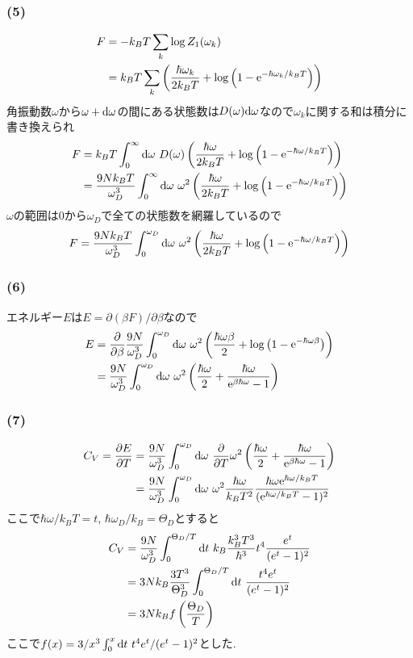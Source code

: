 \subsubsection*{(5)}
\begin{align}
  F&=-k_BT\sum_k\log Z_1(\omega_k)\nonumber\\
  &=k_BT\sum_k\left(\frac{\hbar\omega_k}{2k_BT}+\log\left(1-{\rm e}^{-\hbar\omega_k/k_BT}\right)\right)
\end{align}
角振動数$\omega$から$\omega+{\rm d}\omega$の間にある状態数は$D(\omega){\rm d}\omega$なので$\omega_k$に関する和は積分に書き換えられ
\begin{align}
  F&=k_BT\int_0^\infty{\rm d}\omega\ D(\omega)\left(\frac{\hbar\omega}{2k_BT}+\log\left(1-{\rm e}^{-\hbar\omega/k_BT}\right)\right)\nonumber\\
  &=\frac{9Nk_BT}{\omega_D^3}\int_0^\infty{\rm d}\omega\ \omega^2\left(\frac{\hbar\omega}{2k_BT}+\log\left(1-{\rm e}^{-\hbar\omega/k_BT}\right)\right)
\end{align}
$\omega$の範囲は$0$から$\omega_D$で全ての状態数を網羅しているので
\begin{align}
  F=\frac{9Nk_BT}{\omega_D^3}\int_0^{\omega_D}{\rm d}\omega\ \omega^2\left(\frac{\hbar\omega}{2k_BT}+\log\left(1-{\rm e}^{-\hbar\omega/k_BT}\right)\right)
\end{align}
\subsubsection*{(6)}
エネルギー$E$は$E=\partial(\beta F)/\partial\beta$なので
\begin{align}
  E&=\frac{\partial}{\partial\beta}\frac{9N}{\omega_D^3}\int_0^{\omega_D}{\rm d}\omega\ \omega^2\left(\frac{\hbar\omega\beta}{2}+\log\left(1-{\rm e}^{-\hbar\omega\beta}\right)\right)\nonumber\\
  &=\frac{9N}{\omega_D^3}\int_0^{\omega_D}{\rm d}\omega\ \omega^2\left(\frac{\hbar\omega}{2}+\frac{\hbar\omega}{{\rm e}^{\beta\hbar\omega}-1}\right)
\end{align}
\subsubsection*{(7)}
\begin{align}
  C_V=\frac{\partial E}{\partial T}&=\frac{9N}{\omega_D^3}\int_0^{\omega_D}{\rm d}\omega\ \frac{\partial}{\partial T}\omega^2\left(\frac{\hbar\omega}{2}+\frac{\hbar\omega}{{\rm e}^{\beta\hbar\omega}-1}\right)\nonumber\\
  &=\frac{9N}{\omega_D^3}\int_0^{\omega_D}{\rm d}\omega\ \omega^2\frac{\hbar\omega}{k_BT^2}\frac{\hbar\omega{\rm e}^{\hbar\omega/k_BT}}{({\rm e}^{\hbar\omega/k_BT}-1)^2}
\end{align}
ここで$\hbar\omega/k_BT=t$, $\hbar\omega_D/k_B=\Theta_D$とすると
\begin{align}
  C_V&=\frac{9N}{\omega_D^3}\int_0^{\Theta_D/T}{\rm d}t\ k_B\frac{k_B^3T^3}{\hbar^3}t^4\frac{e^t}{(e^t-1)^2}\nonumber\\
  &=3Nk_B\frac{3T^3}{\Theta_D^3}\int_0^{\Theta_D/T}{\rm d}t\ \frac{t^4e^t}{(e^t-1)^2}\nonumber\\
  &=3Nk_Bf\left(\frac{\Theta_D}{T}\right)
\end{align}
ここで$f(x)=3/x^3\int_0^x{\rm d}t\ t^4e^t/(e^t-1)^2$とした.

